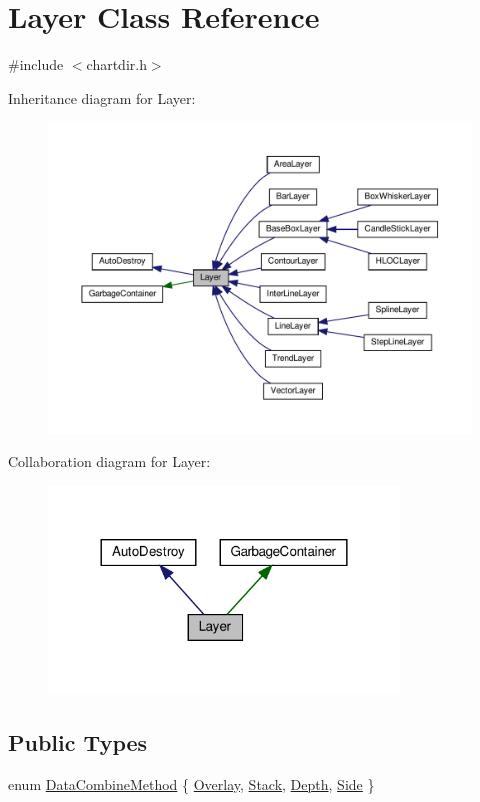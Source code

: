 \hypertarget{class_layer}{}\section{Layer Class Reference}
\label{class_layer}


{\ttfamily \#include $<$chartdir.\+h$>$}



Inheritance diagram for Layer\+:
\nopagebreak
\begin{figure}[H]
\begin{center}
\leavevmode
\includegraphics[width=350pt]{class_layer__inherit__graph}
\end{center}
\end{figure}


Collaboration diagram for Layer\+:
\nopagebreak
\begin{figure}[H]
\begin{center}
\leavevmode
\includegraphics[width=264pt]{class_layer__coll__graph}
\end{center}
\end{figure}
\subsection*{Public Types}
\begin{DoxyCompactItemize}
\item 
enum \hyperlink{class_layer_ab29b553b471eb550d5e950aad5100ac4}{Data\+Combine\+Method} \{ \hyperlink{class_layer_ab29b553b471eb550d5e950aad5100ac4a04fb1cec4351175797a3ae66a2b7702b}{Overlay}, 
\hyperlink{class_layer_ab29b553b471eb550d5e950aad5100ac4af5f2d95bb4682c2551f4b5d355061add}{Stack}, 
\hyperlink{class_layer_ab29b553b471eb550d5e950aad5100ac4a388cb52c5ed7572fcd054bd82b7793c0}{Depth}, 
\hyperlink{class_layer_ab29b553b471eb550d5e950aad5100ac4a95ea1cd9969fb2f568c1e2c434a21ae7}{Side}
 \}
\end{DoxyCompactItemize}

